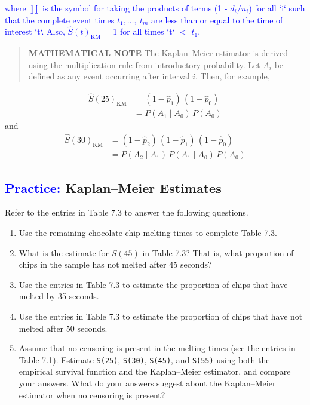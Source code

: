\documentclass[
]{report}
\begin{document}
\textcolor{blue}{where $\scriptstyle \prod$ is the symbol for taking the products of terms (1 - $\scriptstyle d_i/n_i$) for all `i` such that the complete event times $\scriptstyle t_1,\dots,\ t_m$ are less than or equal to the time of interest `t`. Also, $\scriptstyle \hat S(t)_{\mathrm{KM}}$ = 1 for all times `t` $\scriptstyle <$ $\scriptstyle t_1$.}

\begin{quote}
\textbf{MATHEMATICAL NOTE} The Kaplan--Meier estimator is derived using the multiplication rule from introductory probability. Let \(A_i\) be defined as any event occurring after interval \(i\). Then, for example,
\end{quote}

\begin{align}
\hat S(25)_{\mathrm{KM}} &= (1 - \hat p_1)\,(1 - \hat p_0) \\
&= P(A_1 \mid A_0)\,P(A_0)
\end{align}
and
\begin{align}
\hat S(30)_{\mathrm{KM}} &= (1 - \hat p_2)\,(1 - \hat p_1)\,(1 - \hat p_0) \\
&= P(A_2 \mid A_1)\,P(A_1 \mid A_0)\,P(A_0)
\end{align}

\hypertarget{kaplanmeier-estimates}{%
\subsection*{\texorpdfstring{\textcolor{blue}{Practice:} Kaplan--Meier Estimates}{ Kaplan--Meier Estimates}}\label{kaplanmeier-estimates}}

Refer to the entries in Table 7.3 to answer the following questions.

\begin{enumerate}
\def\labelenumi{\arabic{enumi}.}
\setcounter{enumi}{12}
\item
  Use the remaining chocolate chip melting times to complete Table 7.3.
\item
  What is the estimate for \(\scriptstyle S(45)\) in Table 7.3? That is, what proportion of chips in the sample has not melted after 45 seconds?
\item
  Use the entries in Table 7.3 to estimate the proportion of chips that have melted by 35 seconds.
\item
  Use the entries in Table 7.3 to estimate the proportion of chips that have not melted after 50 seconds.
\item
  Assume that no censoring is present in the melting times (see the entries in Table 7.1). Estimate \texttt{S(25)}, \texttt{S(30)}, \texttt{S(45)}, and \texttt{S(55)} using both the empirical survival function and the Kaplan--Meier estimator, and compare your answers. What do your answers suggest about the Kaplan--Meier estimator when no censoring is present?
\end{enumerate}
\end{document}
